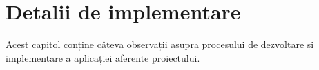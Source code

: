 \documentclass[12pt,a4paper]{report}
\begin{document}
%
%
%
%
%
%
%



\chapter{Detalii de implementare}

Acest capitol conține câteva observații asupra procesului de dezvoltare și implementare a aplicației aferente proiectului.
\end{document}
